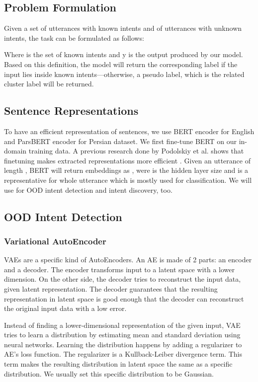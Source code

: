 \documentclass{article}
\begin{document}
\subsection{Problem Formulation}

\noindent Given a set  of utterances with known intents and
 of utterances with unknown intents,
the task can be formulated as follows:



Where  is the set of known intents and y is the output produced by our model. 
Based on this definition, the model will return the corresponding label if the input lies inside known intents—otherwise,
a pseudo label, which is the related cluster label will be returned.

\subsection{Sentence Representations}

To have an efficient representation of sentences, we use BERT encoder \citep{vaswani2017attention} for English and ParsBERT encoder \citep{farahani2021parsbert} for Persian dataset.
We first fine-tune BERT on our in-domain training data. A previous research done by Podolskiy et al. shows that
finetuning makes extracted representations more efficient \citep{podolskiy2021revisiting}.
Given an utterance of length , BERT will return embeddings as ,
were  is the hidden layer size and  is a representative for whole utterance which is mostly used for classification.
We will use  for OOD intent detection and intent discovery, too.

\subsection{OOD Intent Detection}\label{id}

\subsubsection{Variational AutoEncoder}
VAEs are a specific kind of AutoEncoders.
An AE is made of 2 parts: an encoder and a decoder.
The encoder transforms input to a latent space with a lower dimension.
On the other side, the decoder tries to reconstruct the input data, given latent representation.
The decoder guarantees that the resulting representation in latent space is good enough that the decoder can reconstruct the original input data with a low error.

Instead of finding a lower-dimensional representation of the given input,
VAE tries to learn a distribution by estimating mean and standard deviation using neural networks.
Learning the distribution happens by adding a regularizer to AE's loss function.
The regularizer is a Kullback-Leiber divergence term.
This term makes the resulting distribution in latent space the same as a specific distribution.
We usually set this specific distribution to be Gaussian.
\end{document}
